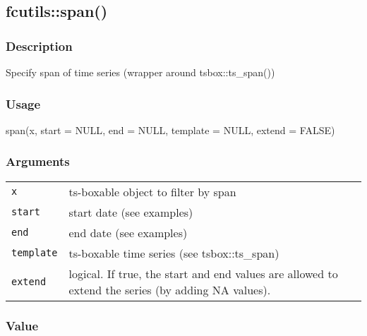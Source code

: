 \documentclass[
  letterpaper,
  DIV=11,
  numbers=noendperiod]{scrreport}
\newenvironment{Shaded}{\begin{snugshade}}{\end{snugshade}}
\newcommand{\AttributeTok}[1]{\textcolor[rgb]{0.40,0.45,0.13}{#1}}
\newcommand{\ConstantTok}[1]{\textcolor[rgb]{0.56,0.35,0.01}{#1}}
\newcommand{\FunctionTok}[1]{\textcolor[rgb]{0.28,0.35,0.67}{#1}}
\newcommand{\NormalTok}[1]{\textcolor[rgb]{0.00,0.23,0.31}{#1}}
\begin{document}
\subsection{fcutils::span()}\label{fcutilsspan}

\subsubsection{Description}\label{description-13}

Specify span of time series (wrapper around tsbox::ts\_span())

\subsubsection{Usage}\label{usage-13}

\begin{Shaded}
\begin{Highlighting}[]
\FunctionTok{span}\NormalTok{(x, }\AttributeTok{start =} \ConstantTok{NULL}\NormalTok{, }\AttributeTok{end =} \ConstantTok{NULL}\NormalTok{, }\AttributeTok{template =} \ConstantTok{NULL}\NormalTok{, }\AttributeTok{extend =} \ConstantTok{FALSE}\NormalTok{)}
\end{Highlighting}
\end{Shaded}

\subsubsection{Arguments}\label{arguments-13}

\begin{longtable}[]{@{}ll@{}}
\toprule\noalign{}
\endhead
\bottomrule\noalign{}
\endlastfoot
\texttt{x} & ts-boxable object to filter by span \\
\texttt{start} & start date (see examples) \\
\texttt{end} & end date (see examples) \\
\texttt{template} & ts-boxable time series (see tsbox::ts\_span) \\
\texttt{extend} & logical. If true, the start and end values are allowed
to extend the series (by adding NA values). \\
\end{longtable}

\subsubsection{Value}\label{value-13}
\end{document}
